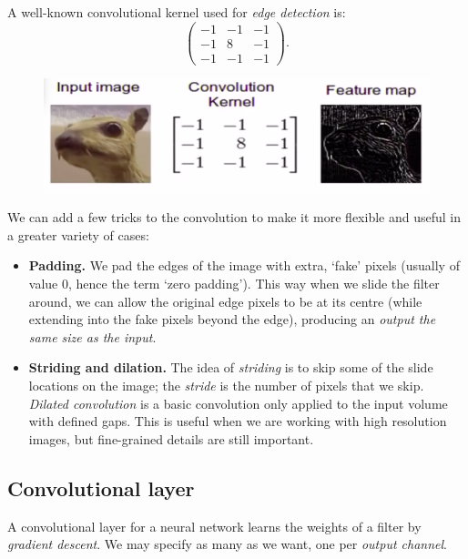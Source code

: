 \newpage
\begin{frameex}
A well-known convolutional kernel used for \textit{edge detection} is:
\begin{equation*}
\begin{pmatrix} -1 & -1 & -1 \\ -1 & 8 & -1 \\ -1 & -1 & -1 \end{pmatrix}.
\end{equation*}
\begin{figure}[H]
\centering
\includegraphics[scale=0.4]{edgedetection.png}
\end{figure}
\end{frameex}

\minirule

We can add a few tricks to the convolution to make it more flexible and useful in a greater variety of cases:
\begin{itemize}
\item \textbf{Padding.} We pad the edges of the image with extra, `fake' pixels (usually of value $0$, hence the term `zero padding'). This way when we slide the filter around, we can allow the original edge pixels to be at its centre (while extending into the fake pixels beyond the edge), producing an \textit{output the same size as the input}.
\item \textbf{Striding and dilation.} The idea of \textit{striding} is to skip some of the slide locations on the image; the \textit{stride} is the number of pixels that we skip.\\

\textit{Dilated convolution} is a basic convolution only applied to the input volume with defined gaps. This is useful when we are working with high resolution images, but fine-grained details are still important. 
\end{itemize}



\minirule


\subsection{Convolutional layer}
A convolutional layer for a neural network learns the weights of a filter by \textit{gradient descent}. We may specify as many as we want, one per \textit{output channel}.\\

